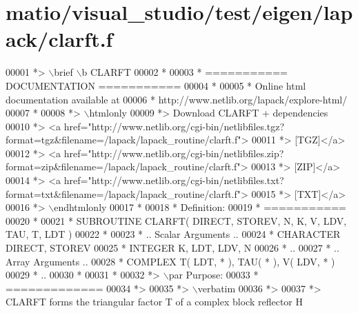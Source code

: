 \hypertarget{matio_2visual__studio_2test_2eigen_2lapack_2clarft_8f_source}{}\section{matio/visual\+\_\+studio/test/eigen/lapack/clarft.f}
\label{matio_2visual__studio_2test_2eigen_2lapack_2clarft_8f_source}

\begin{DoxyCode}
00001 \textcolor{comment}{*> \(\backslash\)brief \(\backslash\)b CLARFT}
00002 \textcolor{comment}{*}
00003 \textcolor{comment}{*  =========== DOCUMENTATION ===========}
00004 \textcolor{comment}{*}
00005 \textcolor{comment}{* Online html documentation available at }
00006 \textcolor{comment}{*            http://www.netlib.org/lapack/explore-html/ }
00007 \textcolor{comment}{*}
00008 \textcolor{comment}{*> \(\backslash\)htmlonly}
00009 \textcolor{comment}{*> Download CLARFT + dependencies }
00010 \textcolor{comment}{*> <a
       href="http://www.netlib.org/cgi-bin/netlibfiles.tgz?format=tgz&filename=/lapack/lapack\_routine/clarft.f"> }
00011 \textcolor{comment}{*> [TGZ]</a> }
00012 \textcolor{comment}{*> <a
       href="http://www.netlib.org/cgi-bin/netlibfiles.zip?format=zip&filename=/lapack/lapack\_routine/clarft.f"> }
00013 \textcolor{comment}{*> [ZIP]</a> }
00014 \textcolor{comment}{*> <a
       href="http://www.netlib.org/cgi-bin/netlibfiles.txt?format=txt&filename=/lapack/lapack\_routine/clarft.f"> }
00015 \textcolor{comment}{*> [TXT]</a>}
00016 \textcolor{comment}{*> \(\backslash\)endhtmlonly }
00017 \textcolor{comment}{*}
00018 \textcolor{comment}{*  Definition:}
00019 \textcolor{comment}{*  ===========}
00020 \textcolor{comment}{*}
00021 \textcolor{comment}{*       SUBROUTINE CLARFT( DIRECT, STOREV, N, K, V, LDV, TAU, T, LDT )}
00022 \textcolor{comment}{* }
00023 \textcolor{comment}{*       .. Scalar Arguments ..}
00024 \textcolor{comment}{*       CHARACTER          DIRECT, STOREV}
00025 \textcolor{comment}{*       INTEGER            K, LDT, LDV, N}
00026 \textcolor{comment}{*       ..}
00027 \textcolor{comment}{*       .. Array Arguments ..}
00028 \textcolor{comment}{*       COMPLEX            T( LDT, * ), TAU( * ), V( LDV, * )}
00029 \textcolor{comment}{*       ..}
00030 \textcolor{comment}{*  }
00031 \textcolor{comment}{*}
00032 \textcolor{comment}{*> \(\backslash\)par Purpose:}
00033 \textcolor{comment}{*  =============}
00034 \textcolor{comment}{*>}
00035 \textcolor{comment}{*> \(\backslash\)verbatim}
00036 \textcolor{comment}{*>}
00037 \textcolor{comment}{*> CLARFT forms the triangular factor T of a complex block reflector H}

\end{DoxyCode}
